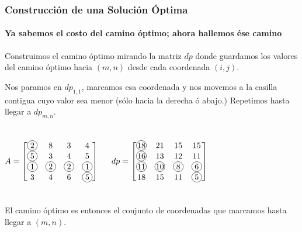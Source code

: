 \documentclass[spanish]{beamer}
\newcommand*\circled[1]{\tikz[baseline=(char.base)]{
    \node[shape=circle,draw,inner sep=1pt] (char) {\hphantom{00}};
    \node[inner sep=1pt] (char) {#1};
}}
\begin{document}
    \begin{frame}
        \frametitle{Construcción de una Solución Óptima}
        \framesubtitle{Ya sabemos el costo del camino óptimo; ahora hallemos ése camino}

        Construimos el camino óptimo mirando la matriz $dp$ donde guardamos los valores del camino óptimo hacia $(m, n)$ desde cada coordenada $(i, j)$.

        \vspace{1em}

        Nos paramos en $dp_{1,1}$, marcamos esa coordenada y nos movemos a la casilla contigua cuyo valor sea menor (sólo hacia la derecha ó abajo.) Repetimos hasta llegar a $dp_{m,n}$.

        \begin{columns}
            $$
            A =
            \begin{bmatrix}
                \circled{2} & 8           & 3           & 4 \\
                \circled{5} & 3           & 4           & 5 \\
                \circled{1} & \circled{2} & \circled{2} & \circled{1} \\
                3           & 4           & 6           & \circled{5}
            \end{bmatrix}
            $$

            $$
            dp =
            \begin{bmatrix}
                \circled{18} & 21           & 15          & 15 \\
                \circled{16} & 13           & 12          & 11 \\
                \circled{11} & \circled{10} & \circled{8} & \circled{6} \\
                18           & 15           & 11          & \circled{5}
            \end{bmatrix}
            $$
        \end{columns}

        \vspace{1em}

        El camino óptimo es entonces el conjunto de coordenadas que marcamos hasta llegar a $(m, n)$.
    \end{frame}
\end{document}

